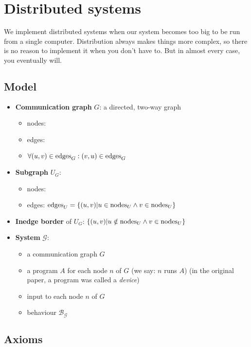 \section{Distributed systems}

We implement distributed systems when our system becomes too big to be run from a single computer. Distribution always makes things more complex, so there is no reason to implement it when you don't have to. But in almost every case, you eventually will. 

\subsection{Model}
\begin{itemize}
    \item \textbf{Communication graph} $G$: a directed, two-way graph
      \begin{itemize}
        \item nodes: 
        \item edges: 
        \item $\forall (u, v) \in  \text{edges}_{G} : (v, u) \in  \text{edges}_{G} $
      \end{itemize}
    \item \textbf{Subgraph} $U_G$:
      \begin{itemize}
        \item nodes: 
        \item edges: $ \text{edges}_{U}  = \{(u, v) | u \in  \text{nodes}_{U}  \land v \in  \text{nodes}_{U} \}$
      \end{itemize}
    \item \textbf{Inedge border} of $U_G$: $\{(u, v) | u \notin  \text{nodes}_{U}  \land v \in  \text{nodes}_{U} \}$
    \item \textbf{System} $\mathcal{G}$:
      \begin{itemize}
        \item a communication graph $G$
        \item a program $A$ for each node $n$ of $G$ (we say: $n$ runs $A$) (in the original paper, a program was called a \emph{device})
        \item input to each node $n$ of $G$
        \item behaviour $\mathcal{B_G}$
      \end{itemize}
\end{itemize}

\subsection{Axioms}
